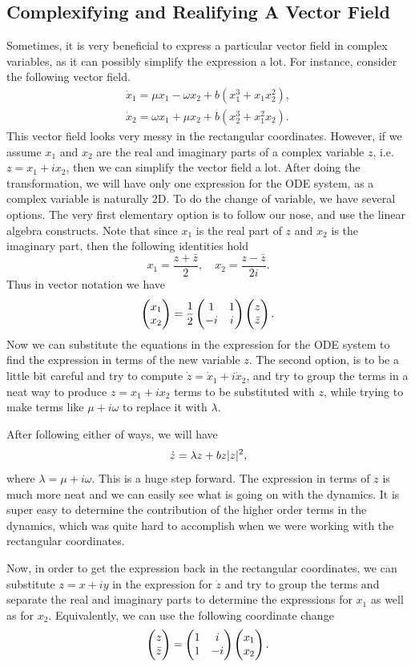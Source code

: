 \subsection{Complexifying and Realifying A Vector Field}
Sometimes, it is very beneficial to express a particular vector field in complex variables, as it can possibly simplify the expression a lot. For instance, consider the following vector field.
\begin{align*}
	\dot{x}_1 = \mu x_1 - \omega x_2 + b(x_1^3 + x_1x_2^2),\\
	\dot{x}_2 = \omega x_1 + \mu x_2 + b(x_2^3 + x_1^2x_2).
\end{align*}
This vector field looks very messy in the rectangular coordinates. However, if we assume $x_1$ and $x_2$ are the real and imaginary parts of a complex variable $z$, i.e. $z = x_1 + ix_2$, then we can simplify the vector field a lot. After doing the transformation, we will have only one expression for the ODE system, as a complex variable is naturally 2D. To do the change of variable, we have several options. The very first elementary option is to follow our nose, and use the linear algebra constructs. Note that since $x_1$ is the real part of $z$ and $x_2$ is the imaginary part, then the following identities hold
\[ x_1 = \frac{z +\bar{z}}{2}, \quad x_2 = \frac{z - \bar{z} }{2i}. \]
Thus in vector notation we have
\[ \begin{pmatrix} x_1 \\ x_2 \end{pmatrix} = \frac{1}{2}\begin{pmatrix} 1 & 1 \\ -i & i \end{pmatrix} \begin{pmatrix} z \\ \bar{z} \end{pmatrix}. \]
Now we can substitute the equations in the expression for the ODE system to find the expression in terms of the new variable $z$. The second option, is to be a little bit careful and try to compute $\dot{z} = \dot{x}_1 + i \dot{x}_2$, and try to group the terms in a neat way to produce $z = x_1 + i x_2$ terms to be substituted with $z$, while trying to make terms like $\mu + i\omega$ to replace it with $\lambda$. 

After following either of ways, we will have
\[ \dot{z} = \lambda z + b z |z|^2, \]
where $\lambda = \mu + i\omega$. This is a huge step forward. The expression in terms of $z$ is much more neat and we can easily see what is going on with the dynamics. It is super easy to determine the contribution of the higher order terms in the dynamics, which was quite hard to accomplish when we were working with the rectangular coordinates.

Now, in order to get the expression back in the rectangular coordinates, we can substitute $z = x + iy$ in the expression for $\dot{z}$ and try to group the terms and separate the real and imaginary parts to determine the expressions for $x_1$ as well as for $x_2$. Equivalently, we can use the following coordinate change
\[  \begin{pmatrix} z \\ \bar{z} \end{pmatrix} = \begin{pmatrix} 1 & i \\ 1 & -i \end{pmatrix} \begin{pmatrix} x_1 \\ x_2 \end{pmatrix}.  \]

